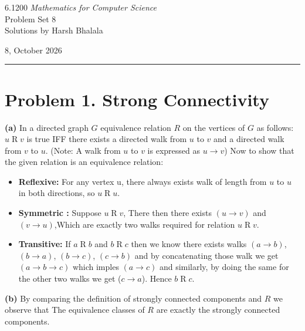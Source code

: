 \documentclass{article}
\begin{document}
\noindent
\begin{minipage}[t]{0.68\textwidth}
{\large 6.1200 \textit{Mathematics for Computer Science}}\\[4pt]
{\large Problem Set 8}\\[4pt]
{\large Solutions by Harsh Bhalala}
\end{minipage}%
\hfill
\begin{minipage}[t]{0.27\textwidth}
\raggedleft
{\large 8, October 2026}
\end{minipage}

\vspace{6pt}

\noindent\rule{\textwidth}{0.5pt}

\section*{Problem 1. Strong Connectivity}

\textbf{(a)} In a directed graph $G$ equivalence relation $R$ on the vertices of $G$ as follows: $u \mathrel{R} v$
is true IFF there exists a directed walk from $u$ to $v$ and a directed walk from $v$ to $u$.
(Note: A walk from $ u$ to $ v$ is expressed as $u \rightarrow v$)
Now to show that the given relation is an equivalence relation:
\begin{itemize}
\item \textbf{Reflexive:} For any vertex u, there always exists walk of length from $u$ to $u$ in both directions, so $u \mathrel{R} u$.
\item \textbf{Symmetric :} Suppose $u \mathrel{R} v$, There then there exists $(u \rightarrow v)$ and $(v \rightarrow u)$,Which are exactly two
walks required for relation $u \mathrel{R} v$.
\item \textbf{Transitive:} If $a \mathrel{R} b$ and $b \mathrel{R} c$ then we know there exists walks $(a \rightarrow b)$, $(b \rightarrow a)$,
$(b \rightarrow c)$, $(c \rightarrow b)$ and by concatenating those walk we get $(a \rightarrow b \rightarrow c)$ which imples $(a \rightarrow c)$
and similarly, by doing the same for the other two walks we get ($c \rightarrow a$). Hence $b \mathrel{R} c$.
\end{itemize}

\vspace{\baselineskip}
\noindent\textbf{(b)}
By comparing the definition of strongly connected components and $R$ we observe that The equivalence classes of $R$ are exactly the strongly connected components.
\end{document}
